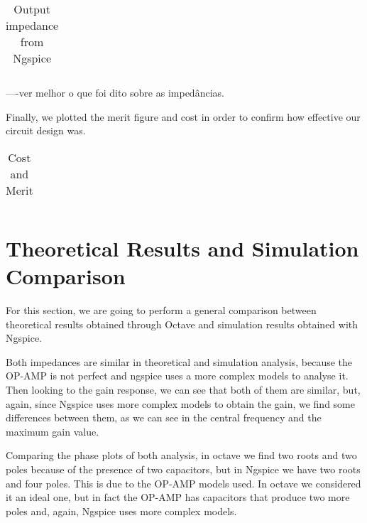\begin{table}[H]
\centering
\begin{tabularx}{0.6\textwidth} {
  | >{\raggedright\arraybackslash}X
  | >{\raggedleft\arraybackslash}X | }
 \hline

\end{tabularx}
\caption{Output impedance from Ngspice}
\end{table}


----ver melhor o que foi dito sobre as impedâncias.

Finally, we plotted the merit figure and cost in order to confirm how effective our circuit design was.


\begin{table}[H]
\centering
\begin{tabularx}{0.6\textwidth} {
  | >{\raggedright\arraybackslash}X
  | >{\raggedleft\arraybackslash}X | }
 \hline

\end{tabularx}
\caption{Cost and Merit}
\end{table}
\section{Theoretical Results and Simulation Comparison}

For this section, we are going to perform a general comparison between theoretical results obtained through Octave and simulation results obtained with Ngspice.

Both impedances are similar in theoretical and simulation
analysis, because the OP-AMP is not perfect and ngspice uses a more complex models to analyse it.
Then looking to the gain response, we can see that both of them are similar, but, again, since Ngspice uses more complex models to obtain the gain, we find some differences between them, as we can see in the central frequency and the maximum gain value.

Comparing the phase plots of both analysis, in octave we find two roots and two poles because of the presence of two capacitors, but in Ngspice we have two roots and four poles. This is due to the OP-AMP models used. In octave we considered it an ideal one, but in fact the OP-AMP has capacitors that produce two more poles and, again, Ngspice uses more complex models.
